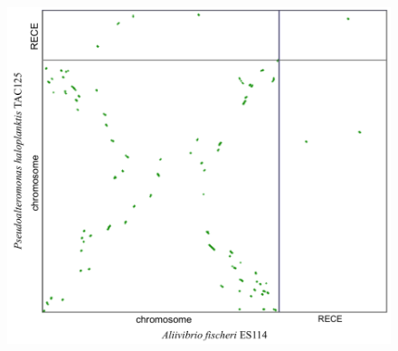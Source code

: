 \begin{figure}[H]
\begin{center}
\begin{minipage}{0.5\textwidth}
   		\label{figsyntvib2}
	\end{minipage}
\\
\hspace{-3cm}
	\begin{minipage}{0.5\textwidth}
   		\includegraphics[width=\textwidth]{./img/synteny/new/fig8_12c.png}
   		\label{figsyntvib3}
	\end{minipage}
	\begin{minipage}{0.5\textwidth}

\end{minipage}
\end{center}
\end{figure}
